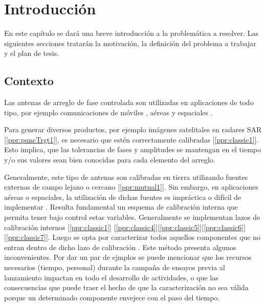 
\chapter{Introducción} %

\label{ch:introduccion} %

En este capítulo se dará una breve introducción a la problemática a resolver. Las siguientes secciones tratarán la motivación,
la definición del problema a trabajar y el plan de tesis.


\section{Contexto}
    
Las antenas de arreglo de fase controlada \cite{Fenn2000} son utilizadas en aplicaciones de todo tipo, por ejemplo comunicaciones 
de móviles \cite{Chen2012}, aéreas 
								   \cite{ppr:punc-ext1} y espaciales \cite{Shimada1995}\cite{Makhoul2012}. 

Para generar diversos productos, por ejemplo imágenes satelitales en radares SAR 
[\ref{ppr:puncTrgt1}], es necesario que estén 
correctamente calibradas 
[\ref{ppr:classic1}]\cite{Seifert1996}\cite{Dall1994}. Esto implica, que las tolerancias de
fases y amplitudes se mantengan en el tiempo y/o sus valores sean bien conocidas
para cada elemento del arreglo.

Generalmente, este tipo de antenas son calibradas en tierra utilizando fuentes 
externas de campo lejano o cercano [\ref{ppr:mutual1}]. Sin embargo, en 
aplicaciones aéreas o espaciales, la utilización de dichas fuentes es impráctica
o difícil de implementar \cite{Aumann1989}. Resulta fundamental un esquema de
calibración interna que permita tener bajo control estas variables. Generalmente
se implementan lazos de calibración internos [\ref{ppr:classic1}]
\cite{Seifert1996}\cite{Dall1994}\cite{Freeman1995}
[\ref{ppr:classic4}][\ref{ppr:classic5}][\ref{ppr:classic6}]
\cite{Srivastava1996}[\ref{ppr:classic7}]\cite{Makhoul2012}. 
Luego se opta por caracterizar todos aquellos componentes que no entran dentro 
de dicho lazo de calibración \cite{Freeman1995}.
Este método presenta algunos inconvenientes. Por dar un par de ejmplos se puede
mencionar que los recursos necesarios (tiempo, personal) durante la campaña de 
ensayos previa al lanzamiento impactan en todo el desarrollo de actividades, o
que las consecuencias que puede traer el hecho de que la caracterización no sea
válida porque un determinado componente envejece con el paso del tiempo.

